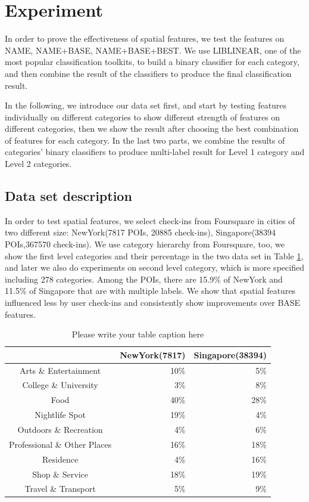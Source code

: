 \section{Experiment}
In order to prove the effectiveness of spatial features, we test the features on NAME, NAME+BASE, NAME+BASE+BEST. We use LIBLINEAR, one of the most popular classification toolkits, to build a binary classifier for each category, and then combine the result of the classifiers to produce the final classification result.

In the following, we introduce our data set first, and start by testing features individually on different categories to show different strength of features on different categories, then we show the result after choosing the best combination of features for each category. In the last two parts, we combine the results of categories' binary classifiers to produce multi-label result for Level 1 category and Level 2 categories.

\subsection{Data set description}
In order to test spatial features, we select check-ins from Foursquare in cities of two different size: NewYork(7817 POIs, 20885 check-ins), Singapore(38394 POIs,367570 check-ins). We use category hierarchy from Foursquare, too, we show the first level categories and their percentage in the two data set in Table \ref{tab:CategoryInfo}, and later we also do experiments on second level category, which is more specified including 278 categories. Among the POIs, there are 15.9\% of NewYork and 11.5\% of Singapore that are with multiple labels. We show that spatial features influenced less by user check-ins and consistently show improvements over BASE features.

\begin{table}
\caption{Please write your table caption here}
\label{tab:CategoryInfo}
\begin{tabular}{|c|r|r|}
\hline
 & NewYork(7817) & Singapore(38394) \\
\hline
Arts \& Entertainment &       10\% &        5\% \\
\hline
College \& University &        3\% &        8\% \\
\hline
      Food &       40\% &       28\% \\
\hline
Nightlife Spot &       19\% &        4\% \\
\hline
Outdoors \& Recreation &        4\% &        6\% \\
\hline
Professional \& Other Places &       16\% &       18\% \\
\hline
 Residence &        4\% &       16\% \\
\hline
Shop \& Service &       18\% &       19\% \\
\hline
Travel \& Transport &        5\% &        9\% \\
\hline
\end{tabular}


\end{table}

